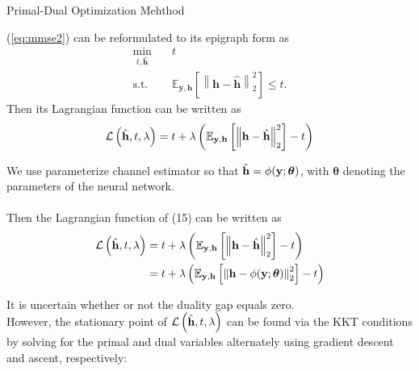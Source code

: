 \documentclass[hyperref={bookmarks=false}]{beamer}
\numberwithin{figure}{section}
\begin{document}
\begin{frame}[allowframebreaks]{Primal-Dual Optimization Mehthod}

(\ref{eq:mmse2}) can be reformulated to its epigraph form as
\begin{equation}
\begin{aligned} \label{eq:epi}
    \min_{t,\hat{\mathbf{h}}} \quad & t \\
    \text{s.t.} \quad & \mathbb{E}_{\mathbf{y},\mathbf{h}}\left[\left\| \mathbf{h}-\hat{\mathbf{h}} \right\|^2_2\right] \leq t.
\end{aligned}
\end{equation}
Then its Lagrangian function can be written as
\begin{equation} \label{eq:Lag1}
    \mathcal{L} \left(\hat{{\bf h}},t,\lambda\right) = t + \lambda\left(\mathbb{E}_{{\bf y},{\bf h}}\left[\left\| {\bf h}-\hat{{\bf h}} \right\|^2_2 \right] -t \right)
\end{equation}

\framebreak

We use parameterize channel estimator so that $\hat{{\bf h}}=\phi(\mathbf{y};\boldsymbol{\theta})$, 
with $\boldsymbol{\theta}$ denoting the parameters of the neural network.
\\ \hspace*{\fill} \\
Then the Lagrangian function of (15) can be written as
\begin{equation*}
    \begin{split}
        \mathcal{L} \left(\hat{{\bf h}},t,\lambda\right)
        &= t + \lambda\left(\mathbb{E}_{{\bf y},{\bf h}}\left[\left\| {\bf h}-\hat{{\bf h}} \right\|^2_2 \right] -t \right)\\
        &= t + \lambda\left(\mathbb{E}_{{\bf y},{\bf h}}\left[\left\| {\bf h}-\phi(\mathbf{y};\boldsymbol{\theta}) \right\|^2_2 \right] -t \right)
    \end{split}
\end{equation*}
\framebreak

It is uncertain whether or not the duality gap equals zero.\\
However, the stationary point of $  \mathcal{L} \left(\hat{{\bf h}},t,\lambda\right)$
can be found via the KKT conditions by solving for the primal and dual
variables alternately using gradient descent and ascent, respectively:


\end{frame}
\end{document}
